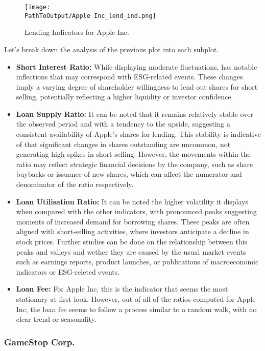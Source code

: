 \begin{figure}[H]
\centering
\caption{Lending Indicators for Apple Inc.}
  \centering
  \texttt{[image: \\PathToOutput/Apple Inc\_lend\_ind.png]}
\label{fig:apple_lending_indicators}
\end{figure}

Let's break down the analysis of the previous plot into each subplot.

\begin{itemize}
	\item\textbf{Short Interest Ratio:} While displaying moderate fluctuations, has notable inflections that may correspond with ESG-related events. These changes imply a varying degree of shareholder willingness to lend out shares for short selling, potentially reflecting a higher liquidity or investor confidence.
	\item\textbf{Loan Supply Ratio:} It can be noted that it remains relatively stable over the observed period and with a tendency to the upside, suggesting a consistent availability of Apple's shares for lending. This stability is indicative of that significant changes in shares outstanding are uncommon, not generating high spikes in short selling. However, the movements within the ratio may reflect strategic financial decisions by the company, such as share buybacks or issuance of new shares, which can affect the numerator and denominator of the ratio respectively.
	\item\textbf{Loan Utilisation Ratio:} It can be noted the higher volatility it displays when compared with the other indicators, with pronounced peaks suggesting moments of increased demand for borrowing shares. These peaks are often aligned with short-selling activities, where investors anticipate a decline in stock prices. Further studies can be done on the relationship between this peaks and valleys and wether they are caused by the usual market events such as earnings reports, product launches, or publications of macroeconomic indicators or ESG-releted events.
	\item\textbf{Loan Fee:} For Apple Inc, this is the indicator that seems the most stationary at first look. However, out of all of the ratios computed for Apple Inc, the loan fee seems to follow a process similar to a random walk, with no clear trend or seasonality.
\end{itemize}


\subsubsection{GameStop Corp.}

